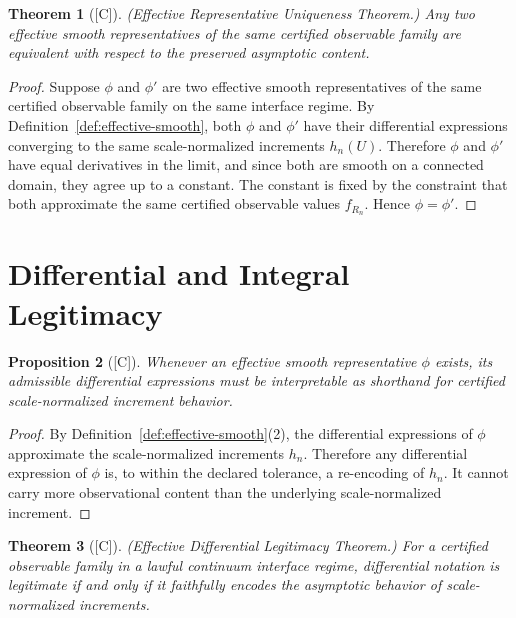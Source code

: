 \documentclass[12pt,oneside]{amsbook}
\theoremstyle{plain}
\newtheorem{theorem}{Theorem}[section]
\newtheorem{proposition}[theorem]{Proposition}
\theoremstyle{definition}
\theoremstyle{remark}
\newcommand{\status}[1]{\textup{[#1]}}
\begin{document}
\begin{theorem}[\status{C}]\label{thm:effective-rep-uniqueness}
\textup{(Effective Representative Uniqueness Theorem.)}  Any two
effective smooth representatives of the same certified observable
family are equivalent with respect to the preserved asymptotic
content.
\end{theorem}

\begin{proof}
Suppose $\phi$ and $\phi'$ are two effective smooth representatives of
the same certified observable family on the same interface regime.  By
Definition~\ref{def:effective-smooth}, both $\phi$ and $\phi'$ have
their differential expressions converging to the same scale-normalized
increments $h_n(U)$.  Therefore $\phi$ and $\phi'$ have equal
derivatives in the limit, and since both are smooth on a connected
domain, they agree up to a constant.  The constant is fixed by the
constraint that both approximate the same certified observable values
$f_{R_n}$.  Hence $\phi = \phi'$.
\end{proof}

\section{Differential and Integral Legitimacy}

\begin{proposition}[\status{C}]\label{prop:differential-shorthand}
Whenever an effective smooth representative $\phi$ exists, its
admissible differential expressions must be interpretable as shorthand
for certified scale-normalized increment behavior.
\end{proposition}

\begin{proof}
By Definition~\ref{def:effective-smooth}\textup{(2)}, the differential
expressions of $\phi$ approximate the scale-normalized increments $h_n$.
Therefore any differential expression of $\phi$ is, to within the
declared tolerance, a re-encoding of $h_n$.  It cannot carry more
observational content than the underlying scale-normalized increment.
\end{proof}

\begin{theorem}[\status{C}]\label{thm:differential-legitimacy}
\textup{(Effective Differential Legitimacy Theorem.)}  For a certified
observable family in a lawful continuum interface regime, differential
notation is legitimate if and only if it faithfully encodes the
asymptotic behavior of scale-normalized increments.
\end{theorem}
\end{document}
